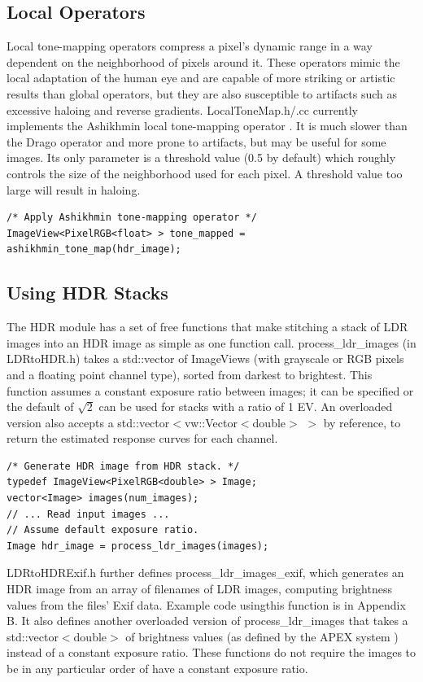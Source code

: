 \subsection{Local Operators}
Local tone-mapping operators compress a pixel's dynamic range in a way
dependent on the neighborhood of pixels around it. These operators
mimic the local adaptation of the human eye and are capable of more
striking or artistic results than global operators, but they are also
susceptible to artifacts such as excessive haloing and reverse
gradients. LocalToneMap.h/.cc currently implements the Ashikhmin local
tone-mapping operator \cite{ashikhmin}.  It is much slower than the
Drago operator and more prone to artifacts, but may be useful for some
images. Its only parameter is a threshold value (0.5 by default) which
roughly controls the size of the neighborhood used for each pixel. A
threshold value too large will result in haloing.

\begin{verbatim}
/* Apply Ashikhmin tone-mapping operator */
ImageView<PixelRGB<float> > tone_mapped = ashikhmin_tone_map(hdr_image);
\end{verbatim}

\subsection{Using HDR Stacks}
The HDR module has a set of free functions that make stitching a stack of LDR
images into an HDR image as simple as one function call. process\_ldr\_images (in 
LDRtoHDR.h) takes a std::vector of ImageViews (with grayscale or RGB pixels
and a floating point channel type), sorted from darkest to brightest. This
function assumes a constant exposure ratio between images; it can be specified
or the default of $\sqrt{2}$ can be used for stacks with a ratio of 1 EV. An
overloaded version also accepts a std::vector$<$vw::Vector$<$double$>$ $>$ by reference,
to return the estimated response curves for each channel.

\begin{verbatim}
/* Generate HDR image from HDR stack. */
typedef ImageView<PixelRGB<double> > Image;
vector<Image> images(num_images);
// ... Read input images ...
// Assume default exposure ratio.
Image hdr_image = process_ldr_images(images);
\end{verbatim}

LDRtoHDRExif.h further defines process\_ldr\_images\_exif, which generates an HDR
image from an array of filenames of LDR images, computing brightness values
from the files' Exif data. Example code usingthis function is in Appendix B. It
also defines another overloaded version of process\_ldr\_images that takes a
std::vector$<$double$>$ of brightness values (as defined by the APEX system \cite{apex})
instead of a constant exposure ratio. These functions do not require the images
to be in any particular order of have a constant exposure ratio.

